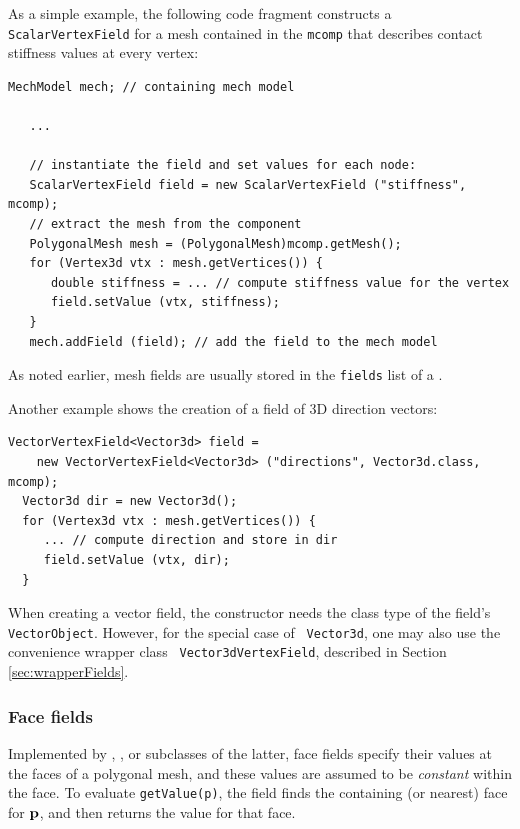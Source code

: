 As a simple example, the following code fragment constructs a {\tt
ScalarVertexField} for a mesh contained in the 
 {\tt mcomp}
that describes contact stiffness values 
at every vertex:
%
\begin{lstlisting}[]
   MechModel mech; // containing mech model
   
   ...

   // instantiate the field and set values for each node:
   ScalarVertexField field = new ScalarVertexField ("stiffness", mcomp);
   // extract the mesh from the component
   PolygonalMesh mesh = (PolygonalMesh)mcomp.getMesh();
   for (Vertex3d vtx : mesh.getVertices()) {
      double stiffness = ... // compute stiffness value for the vertex
      field.setValue (vtx, stiffness);
   }
   mech.addField (field); // add the field to the mech model
\end{lstlisting}
%
As noted earlier, mesh fields are usually stored in the {\tt fields}
list of a .

Another example shows the creation of a field of 3D direction vectors:
%
\begin{lstlisting}[]
  VectorVertexField<Vector3d> field =
    new VectorVertexField<Vector3d> ("directions", Vector3d.class, mcomp);
  Vector3d dir = new Vector3d();
  for (Vertex3d vtx : mesh.getVertices()) {
     ... // compute direction and store in dir
     field.setValue (vtx, dir);
  }
\end{lstlisting}
%
When creating a vector field, the constructor needs the class type of
the field's {\tt VectorObject}. However, for the special case of {\tt
Vector3d}, one may also use the convenience wrapper class {\tt
Vector3dVertexField}, described in Section \ref{sec:wrapperFields}.

\subsubsection{Face fields}

Implemented by
,
, 
or subclasses of the latter, face fields specify their values at the
faces of a polygonal mesh, and these values are assumed to be {\it
constant} within the face. To evaluate {\tt getValue(p)}, the field
finds the containing (or nearest) face for ${\bf p}$, and then returns the
value for that face.

